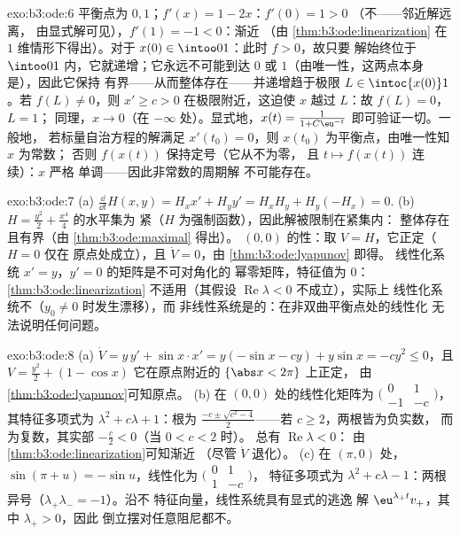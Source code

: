 \begin{solution}{exo:b3:ode:6}
平衡点为 $0, 1$；$f'(x) = 1 - 2x$：$f'(0) = 1 > 0$
（不——邻近解远离，
由显式解可见），$f'(1) = -1 < 0$：渐近
（由 \cref{thm:b3:ode:linearization} 在 $1$ 维情形下得出）。对于
$x(0) \in \intoo01$：此时 $f > 0$，故只要
解始终位于 $\intoo01$ 内，它就递增；它永远不可能到达
$0$ 或 $1$（由唯一性，这两点本身是），因此它保持
有界——从而整体存在——并递增趋于极限 $L
\in \intoc{x(0)}1$。若 $f(L) \neq 0$，则 $x' \geq c > 0$
在极限附近，这迫使 $x$ 越过 $L$：故 $f(L) = 0$，$L = 1$；
同理，$x \to 0$（在 $-\infty$ 处）。显式地，$x(t) =
\frac1{1 + C\eu^{-t}}$ 即可验证一切。一般地，
若标量自治方程的解满足 $x'(t_0) = 0$，则 $x(t_0)$
为平衡点，由唯一性知 $x$ 为常数；
否则 $f(x(t))$ 保持定号（它从不为零，
且 $t \mapsto f(x(t))$ 连续）：$x$ 严格
单调——因此非常数的周期解
不可能存在。
\end{solution}

\begin{solution}{exo:b3:ode:7}
(a) $\frac{\dd}{\dd t}H(x,y) = H_xx' + H_yy' = H_xH_y +
H_y(-H_x) = 0$.
(b) $H = \frac{y^2}2 + \frac{x^4}4$ 的水平集为
紧（$H$ 为强制函数），因此解被限制在紧集内：
整体存在且有界（由 \cref{thm:b3:ode:maximal} 得出）。
$(0,0)$ 的性：取 $V = H$，它正定（$H = 0$ 仅在
原点处成立），且 $\dot V = 0$，由 \cref{thm:b3:ode:lyapunov} 即得。
线性化系统 $x' = y$，$y' = 0$ 的矩阵是不可对角化的
幂零矩阵，特征值为 $0$：
\cref{thm:b3:ode:linearization} 不适用（其假设
$\operatorname{Re}\lambda < 0$ 不成立），实际上
线性化系统不（$y_0 \ne 0$ 时发生漂移），而
非线性系统是的：在非双曲平衡点处的线性化
无法说明任何问题。
\end{solution}

\begin{solution}{exo:b3:ode:8}
(a) $\dot V = y\,y' + \sin x\cdot x' = y(-\sin x - cy) +
y\sin x = -cy^2 \leq 0$，且 $V = \frac{y^2}2 + (1 - \cos x)$
它在原点附近的 $\{\abs x < 2\pi\}$ 上正定，
由\cref{thm:b3:ode:lyapunov}可知原点。
(b) 在 $(0,0)$ 处的线性化矩阵为
$\bigl(\begin{smallmatrix}0 & 1\\ -1 &
-c\end{smallmatrix}\bigr)$，其特征多项式为
$\lambda^2 + c\lambda + 1$：根为 $\frac{-c \pm \sqrt{c^2 -
4}}2$——若 $c \geq 2$，两根皆为负实数，
而为复数，其实部 $-\frac c2 < 0$（当 $0 < c < 2$ 时）。
总有 $\operatorname{Re}\lambda < 0$：
由\cref{thm:b3:ode:linearization}可知渐近
（尽管 $\dot V$ 退化）。
(c) 在 $(\pi, 0)$ 处，$\sin(\pi + u) = -\sin u$，线性化为
$\bigl(\begin{smallmatrix}0&1\\1&-c\end{smallmatrix}\bigr)$，
特征多项式为 $\lambda^2 + c\lambda - 1$：两根
异号（$\lambda_+\lambda_- = -1$）。沿不
特征向量，线性系统具有显式的逃逸
解 $\eu^{\lambda_+t}v_+$，其中 $\lambda_+ > 0$，因此
倒立摆对任意阻尼都不。
\end{solution}


